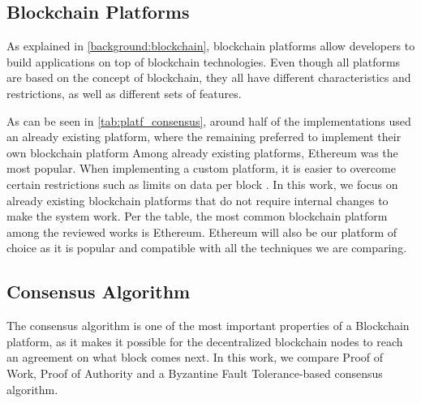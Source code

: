 \subsection{Blockchain Platforms}\label{background:blockchain_platforms}
 
As explained in \autoref{background:blockchain}, blockchain platforms allow developers to build applications on top of blockchain technologies. Even though all platforms are based on the concept of blockchain, they all have different characteristics and restrictions, as well as different sets of features.

As can be seen in \autoref{tab:platf_consensus}, around half of the implementations used an already existing platform, where the remaining preferred to implement their own blockchain platform Among already existing platforms, Ethereum was the most popular. When implementing a custom platform, it is easier to overcome certain restrictions such as limits on data per block \cite{8733825, 9524833}. In this work, we focus on already existing blockchain platforms that do not require internal changes to make the system work. Per the table, the most common blockchain platform among the reviewed works is Ethereum. Ethereum will also be our platform of choice as it is popular and compatible with all the techniques we are comparing.

\subsection{Consensus Algorithm}\label{background:consensus_algorithms}

The consensus algorithm is one of the most important properties of a Blockchain platform, as it makes it possible for the decentralized blockchain nodes to reach an agreement on what block comes next. In this work, we compare Proof of Work, Proof of Authority and a Byzantine Fault Tolerance-based consensus algorithm.

